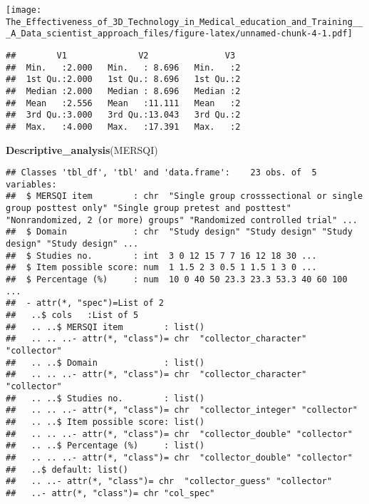 \documentclass[]{article}
\newenvironment{Shaded}{\begin{snugshade}}{\end{snugshade}}
\newcommand{\KeywordTok}[1]{\textcolor[rgb]{0.13,0.29,0.53}{\textbf{#1}}}
\newcommand{\NormalTok}[1]{#1}
\newcommand{\OperatorTok}[1]{\textcolor[rgb]{0.81,0.36,0.00}{\textbf{#1}}}
\begin{document}
\begin{Shaded}
\end{Shaded}

\texttt{[image: The\_Effectiveness\_of\_3D\_Technology\_in\_Medical\_education\_and\_Training\_\_\_A\_Data\_scientist\_approach\_files/figure-latex/unnamed-chunk-4-1.pdf]}

\begin{verbatim}
##        V1              V2               V3   
##  Min.   :2.000   Min.   : 8.696   Min.   :2  
##  1st Qu.:2.000   1st Qu.: 8.696   1st Qu.:2  
##  Median :2.000   Median : 8.696   Median :2  
##  Mean   :2.556   Mean   :11.111   Mean   :2  
##  3rd Qu.:3.000   3rd Qu.:13.043   3rd Qu.:2  
##  Max.   :4.000   Max.   :17.391   Max.   :2
\end{verbatim}

\begin{Shaded}
\begin{Highlighting}[]
\KeywordTok{Descriptive_analysis}\NormalTok{(MERSQI)}
\end{Highlighting}
\end{Shaded}

\begin{verbatim}
## Classes 'tbl_df', 'tbl' and 'data.frame':    23 obs. of  5 variables:
##  $ MERSQI item        : chr  "Single group crosssectional or single group posttest only" "Single group pretest and posttest" "Nonrandomized, 2 (or more) groups" "Randomized controlled trial" ...
##  $ Domain             : chr  "Study design" "Study design" "Study design" "Study design" ...
##  $ Studies no.        : int  3 0 12 15 7 7 16 12 18 30 ...
##  $ Item possible score: num  1 1.5 2 3 0.5 1 1.5 1 3 0 ...
##  $ Percentage (%)     : num  10 0 40 50 23.3 23.3 53.3 40 60 100 ...
##  - attr(*, "spec")=List of 2
##   ..$ cols   :List of 5
##   .. ..$ MERSQI item        : list()
##   .. .. ..- attr(*, "class")= chr  "collector_character" "collector"
##   .. ..$ Domain             : list()
##   .. .. ..- attr(*, "class")= chr  "collector_character" "collector"
##   .. ..$ Studies no.        : list()
##   .. .. ..- attr(*, "class")= chr  "collector_integer" "collector"
##   .. ..$ Item possible score: list()
##   .. .. ..- attr(*, "class")= chr  "collector_double" "collector"
##   .. ..$ Percentage (%)     : list()
##   .. .. ..- attr(*, "class")= chr  "collector_double" "collector"
##   ..$ default: list()
##   .. ..- attr(*, "class")= chr  "collector_guess" "collector"
##   ..- attr(*, "class")= chr "col_spec"
\end{verbatim}
\end{document}
